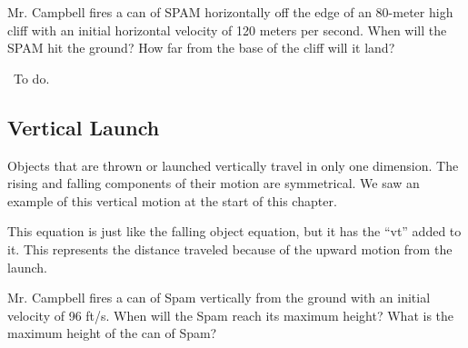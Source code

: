 \begin{boxedex}
Mr. Campbell fires a can of SPAM horizontally off the edge of an 80-meter high cliff with an initial horizontal velocity of 120 meters per second. When will the SPAM hit the ground? How far from the base of the cliff will it land?

\exsoln\ To do.
%
%
%
\end{boxedex}

\subsection{Vertical Launch}

Objects that are thrown or launched vertically travel in only one dimension. The rising and falling components of their motion are symmetrical. We saw an example of this vertical motion at the start of this chapter.

This equation is just like the falling object equation, but it has the ``vt'' added to it. This represents the distance traveled because of the upward motion from the launch.

%
%
%
\begin{boxedex}
Mr. Campbell fires a can of Spam vertically from the ground with an initial velocity of 96 ft/s. When will the Spam reach its maximum height? What is the maximum height of the can of Spam?
%
%
%
%
%
%
%
%
\end{boxedex}


